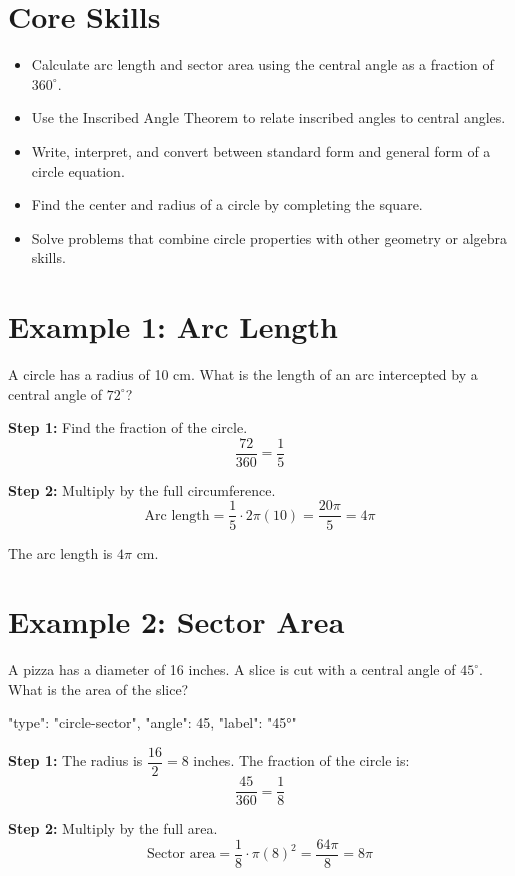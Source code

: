 \documentclass[14pt]{extarticle}
\begin{document}
\section*{Core Skills}
\begin{itemize}
  \item Calculate arc length and sector area using the central angle as a fraction of \(360^\circ\).
  \item Use the Inscribed Angle Theorem to relate inscribed angles to central angles.
  \item Write, interpret, and convert between standard form and general form of a circle equation.
  \item Find the center and radius of a circle by completing the square.
  \item Solve problems that combine circle properties with other geometry or algebra skills.
\end{itemize}

\section*{Example 1: Arc Length}

A circle has a radius of 10 cm. What is the length of an arc intercepted by a central angle of \(72^\circ\)?

\textbf{Step 1:} Find the fraction of the circle.
\[
\frac{72}{360} = \frac{1}{5}
\]

\textbf{Step 2:} Multiply by the full circumference.
\[
\text{Arc length} = \frac{1}{5} \cdot 2\pi(10) = \frac{20\pi}{5} = 4\pi
\]

The arc length is \(\boxed{4\pi}\) cm.

\section*{Example 2: Sector Area}

A pizza has a diameter of 16 inches. A slice is cut with a central angle of \(45^\circ\). What is the area of the slice?

\begin{diagramdata}
{
  "type": "circle-sector",
  "angle": 45,
  "label": "45°"
}
\end{diagramdata}

\textbf{Step 1:} The radius is \(\dfrac{16}{2} = 8\) inches. The fraction of the circle is:
\[
\frac{45}{360} = \frac{1}{8}
\]

\textbf{Step 2:} Multiply by the full area.
\[
\text{Sector area} = \frac{1}{8} \cdot \pi(8)^2 = \frac{64\pi}{8} = 8\pi
\]
\end{document}
